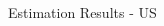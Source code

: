 \documentclass[final]{beamer}
\begin{document}
\begin{frame}
\begin{columns}[t]
\begin{column}{.53 \linewidth}
\begin{columns}[c]
\begin{column}{.48 \linewidth}
\begin{block}{Estimation Results - US}
\end{block}%

\end{column}%

\end{columns}%

\begin{columns}[t]%

\begin{column}{.48 \linewidth}%

\vspace{.4 cm}%


\end{column}
\end{columns}
\end{column}
\end{columns}
\end{frame}
\end{document}
